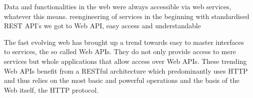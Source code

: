 


Data and functionalities in the web were always accessible via web services, whatever this means.
reengineering of services in the beginning
with standardised REST API's we got to Web API, easy access and understandable


The fast evolving web has brought up a trend towards easy to master interfaces to services, the so called Web APIs.
They do not only provide access to mere services but whole applications that allow access over Web APIs.
These trending Web APIs benefit from a RESTful architecture which predominantly uses HTTP and thus relies on the most basic and powerful operations and the basis of the Web itself, the HTTP protocol. 

